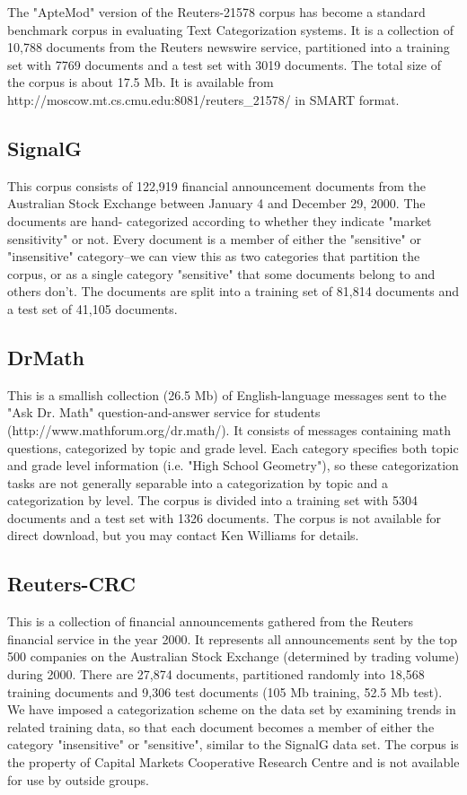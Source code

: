 \documentclass[a4paper]{report}
\begin{document}
The "ApteMod" version of the Reuters-21578 corpus has become a
standard benchmark corpus in evaluating Text Categorization systems.
It is a collection of 10,788 documents from the Reuters newswire
service, partitioned into a training set with 7769 documents and a
test set with 3019 documents.  The total size of the corpus is about
17.5 Mb.  It is available from
http://moscow.mt.cs.cmu.edu:8081/reuters\_21578/ in SMART format.


\subsection{SignalG}
This corpus consists of 122,919 financial announcement documents from
the Australian Stock Exchange between January 4 and December 29, 2000.
The documents are hand- categorized according to whether they indicate
"market sensitivity" or not.  Every document is a member of either the
"sensitive" or "insensitive" category--we can view this as two
categories that partition the corpus, or as a single category
"sensitive" that some documents belong to and others don't.  The
documents are split into a training set of 81,814 documents and a test
set of 41,105 documents.


\subsection{DrMath}
This is a smallish collection (26.5 Mb) of English-language messages
sent to the "Ask Dr. Math" question-and-answer service for students
(http://www.mathforum.org/dr.math/).  It consists of messages
containing math questions, categorized by topic and grade level.  Each
category specifies both topic and grade level information (i.e. "High
School Geometry"), so these categorization tasks are not generally
separable into a categorization by topic and a categorization by
level.  The corpus is divided into a training set with 5304 documents
and a test set with 1326 documents.  The corpus is not available for
direct download, but you may contact Ken Williams for details.


\subsection{Reuters-CRC}
This is a collection of financial announcements gathered from the
Reuters financial service in the year 2000.  It represents all
announcements sent by the top 500 companies on the Australian Stock
Exchange (determined by trading volume) during 2000.  There are 27,874
documents, partitioned randomly into 18,568 training documents and
9,306 test documents (105 Mb training, 52.5 Mb test).  We have imposed
a categorization scheme on the data set by examining trends in related
training data, so that each document becomes a member of either the
category "insensitive" or "sensitive", similar to the SignalG data
set.  The corpus is the property of Capital Markets Cooperative
Research Centre and is not available for use by outside groups.
\end{document}
